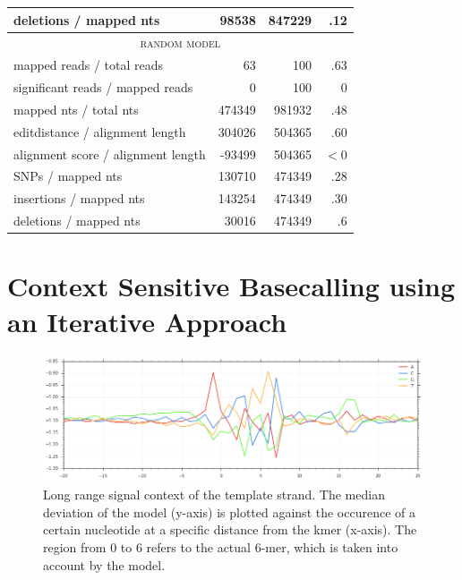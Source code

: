 \documentclass[]{scrartcl}
\begin{document}
\begin{table}[bp]
\begin{tabular}{l|rrr}
deletions / mapped nts & 
98538 & 847229 & .12  \\\hline
 \multicolumn{4}{c}{\textsc{random model}}  \\

mapped reads / total reads 		&
 63 	& 100 	& .63 \\

significant reads / mapped reads & 
0  & 100 & 0 \\

mapped nts / total nts & 
474349 & 981932 & .48 \\

editdistance / alignment length & 
304026 & 504365 & .60 \\

alignment score / alignment length & 
-93499 & 504365 & $<0$ \\

SNPs / mapped nts &  
130710 & 474349 & .28 \\

insertions / mapped nts &  
143254 & 474349 & .30 \\

deletions / mapped nts & 
30016 & 474349 & .6 \\
\hline
\end{tabular}
\end{table}


\section{Context Sensitive Basecalling using an Iterative Approach}
\begin{figure}[tbp]
\centering
\includegraphics[width=\textwidth]{figures/context.png}
\caption[]{Long range signal context of the template strand. The median deviation of the model (y-axis) is plotted against the occurence of a certain nucleotide at a specific distance from the kmer (x-axis). The region from 0 to 6 refers to the actual 6-mer, which is taken into account by the model. }
\label{fig:context}
\end{figure}
\end{document}
